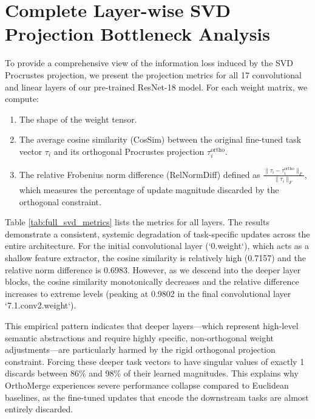 \documentclass{article}
\begin{document}
\section{Complete Layer-wise SVD Projection Bottleneck Analysis}
\label{appendix:svd_bottleneck}
To provide a comprehensive view of the information loss induced by the SVD Procrustes projection, we present the projection metrics for all 17 convolutional and linear layers of our pre-trained ResNet-18 model. For each weight matrix, we compute:
\begin{enumerate}
    \item The shape of the weight tensor.
    \item The average cosine similarity (CosSim) between the original fine-tuned task vector $\tau_i$ and its orthogonal Procrustes projection $\tau_i^{\text{ortho}}$.
    \item The relative Frobenius norm difference (RelNormDiff) defined as $\frac{\|\tau_i - \tau_i^{\text{ortho}}\|_F}{\|\tau_i\|_F}$, which measures the percentage of update magnitude discarded by the orthogonal constraint.
\end{enumerate}

Table \ref{tab:full_svd_metrics} lists the metrics for all layers. The results demonstrate a consistent, systemic degradation of task-specific updates across the entire architecture. For the initial convolutional layer (`0.weight`), which acts as a shallow feature extractor, the cosine similarity is relatively high (0.7157) and the relative norm difference is 0.6983. However, as we descend into the deeper layer blocks, the cosine similarity monotonically decreases and the relative difference increases to extreme levels (peaking at 0.9802 in the final convolutional layer `7.1.conv2.weight`).

This empirical pattern indicates that deeper layers—which represent high-level semantic abstractions and require highly specific, non-orthogonal weight adjustments—are particularly harmed by the rigid orthogonal projection constraint. Forcing these deeper task vectors to have singular values of exactly 1 discards between 86\% and 98\% of their learned magnitudes. This explains why OrthoMerge experiences severe performance collapse compared to Euclidean baselines, as the fine-tuned updates that encode the downstream tasks are almost entirely discarded.
\end{document}
